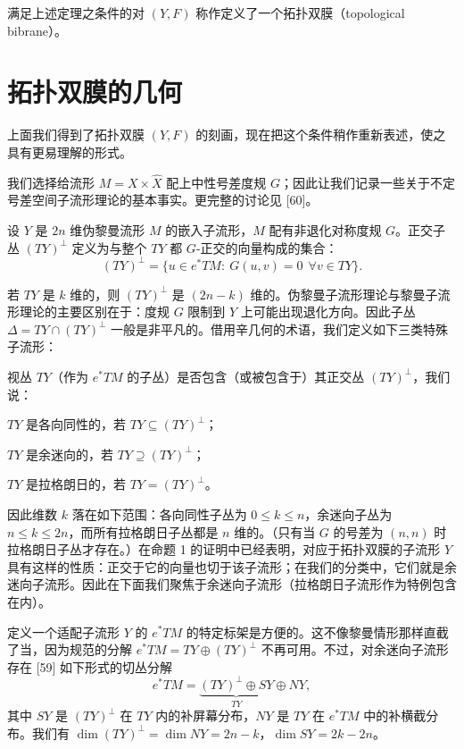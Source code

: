 \begin{definition}[2]
满足上述定理之条件的对 $(Y,F)$ 称作定义了一个拓扑双膜（topological bibrane）。
\end{definition}

\section{拓扑双膜的几何}

上面我们得到了拓扑双膜 $(Y,F)$ 的刻画，现在把这个条件稍作重新表述，使之具有更易理解的形式。

我们选择给流形 $M=X\times\hat X$ 配上中性号差度规 $G$；因此让我们记录一些关于不定号差空间子流形理论的基本事实。更完整的讨论见 [60]。

\begin{definition}[3]
设 $Y$ 是 $2n$ 维伪黎曼流形 $M$ 的嵌入子流形，$M$ 配有非退化对称度规 $G$。正交子丛 $(TY)^\perp$ 定义为与整个 $TY$ 都 $G$-正交的向量构成的集合：
\[
(TY)^\perp=\{u\in e^*TM:\ G(u,v)=0\ \ \forall v\in TY\}.
\]
\end{definition}

若 $TY$ 是 $k$ 维的，则 $(TY)^\perp$ 是 $(2n-k)$ 维的。伪黎曼子流形理论与黎曼子流形理论的主要区别在于：度规 $G$ 限制到 $Y$ 上可能出现退化方向。因此子丛 $\Delta=TY\cap(TY)^\perp$ 一般是非平凡的。借用辛几何的术语，我们定义如下三类特殊子流形：

\begin{definition}[4]
视丛 $TY$（作为 $e^*TM$ 的子丛）是否包含（或被包含于）其正交丛 $(TY)^\perp$，我们说：

$TY$ 是各向同性的，若 $TY\subseteq(TY)^\perp$；

$TY$ 是余迷向的，若 $TY\supseteq(TY)^\perp$；

$TY$ 是拉格朗日的，若 $TY=(TY)^\perp$。
\end{definition}

因此维数 $k$ 落在如下范围：各向同性子丛为 $0\le k\le n$，余迷向子丛为 $n\le k\le 2n$，而所有拉格朗日子丛都是 $n$ 维的。（只有当 $G$ 的号差为 $(n,n)$ 时拉格朗日子丛才存在。）在命题 1 的证明中已经表明，对应于拓扑双膜的子流形 $Y$ 具有这样的性质：正交于它的向量也切于该子流形；在我们的分类中，它们就是余迷向子流形。因此在下面我们聚焦于余迷向子流形（拉格朗日子流形作为特例包含在内）。

定义一个适配子流形 $Y$ 的 $e^*TM$ 的特定标架是方便的。这不像黎曼情形那样直截了当，因为规范的分解 $e^*TM=TY\oplus(TY)^\perp$ 不再可用。不过，对余迷向子流形存在 [59] 如下形式的切丛分解
\[
e^*TM=\underbrace{(TY)^\perp\oplus SY}_{TY}\oplus NY,
\]
其中 $SY$ 是 $(TY)^\perp$ 在 $TY$ 内的补屏幕分布，$NY$ 是 $TY$ 在 $e^*TM$ 中的补横截分布。我们有 $\dim (TY)^\perp=\dim NY=2n-k$，$\dim SY=2k-2n$。

